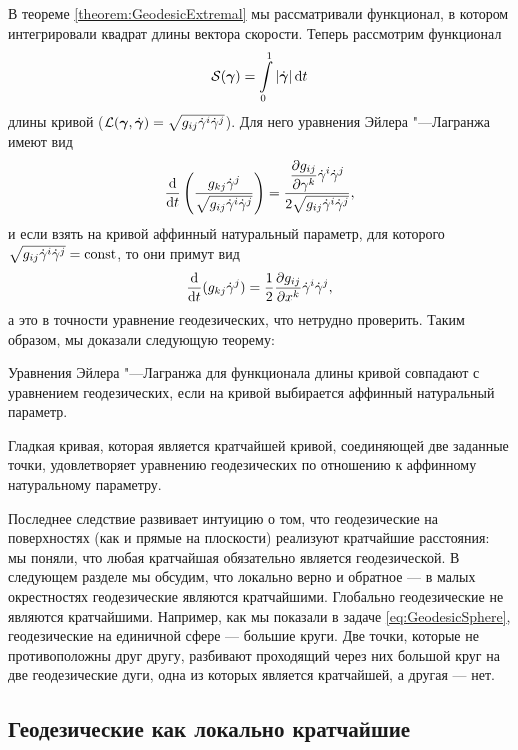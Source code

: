 В теореме \ref{theorem:GeodesicExtremal} мы рассматривали функционал, в котором интегрировали квадрат длины вектора скорости. Теперь рассмотрим функционал
\[
	\mathcal{S}(\boldsymbol{\gamma}) = \int\limits_0^1\left\lvert\dot{\boldsymbol{\gamma}}\right\rvert\mathop{}\!\mathrm{d} t
\]
длины кривой ($\mathcal{L}(\boldsymbol{\gamma}, \dot{\boldsymbol{\gamma}}) = \sqrt{g_{ij}\dot{\gamma}^i\dot{\gamma}^j}$). Для него уравнения Эйлера "---Лагранжа имеют вид
\[
	\frac{\mathop{}\!\mathrm{d}}{\mathop{}\!\mathrm{d} t}\left(\frac{g_{kj}\dot{\gamma}^j}{\sqrt{g_{ij}\dot{\gamma}^i\dot{\gamma}^j}}\right) = \frac{\displaystyle\frac{\partial g_{ij}}{\partial\gamma^k}\dot{\gamma}^i\dot{\gamma}^j}{2\sqrt{g_{ij}\dot{\gamma}^i\dot{\gamma}^j}},
\]
и если взять на кривой аффинный натуральный параметр, для которого $\sqrt{g_{ij}\dot{\gamma}^i\dot{\gamma}^j} = \mathrm{const}$, то они примут вид
\[
	\frac{\mathop{}\!\mathrm{d}}{\mathop{}\!\mathrm{d} t}(g_{kj}\dot{\gamma}^j) = \frac{1}{2}\frac{\partial g_{ij}}{\partial x^k}\dot{\gamma}^i\dot{\gamma}^j,
\]
а это в точности уравнение геодезических, что нетрудно проверить. Таким образом, мы доказали следующую теорему:

\begin{theorem}
	Уравнения Эйлера "---Лагранжа для функционала длины кривой совпадают с уравнением геодезических, если на кривой выбирается аффинный натуральный параметр.
\end{theorem}

\begin{corollary}
	Гладкая кривая, которая является кратчайшей кривой, соединяющей две заданные точки, удовлетворяет уравнению геодезических по отношению к аффинному натуральному параметру.
\end{corollary}

Последнее следствие развивает интуицию о том, что геодезические на поверхностях (как и прямые на плоскости) реализуют кратчайшие расстояния: мы поняли, что любая кратчайшая обязательно является геодезической. В следующем разделе мы обсудим, что локально верно и обратное --- в малых окрестностях геодезические являются кратчайшими. Глобально геодезические не являются кратчайшими. Например, как мы показали в задаче \ref{eq:GeodesicSphere}, геодезические на единичной сфере --- большие круги. Две точки, которые не противоположны друг другу, разбивают проходящий через них большой круг на две геодезические дуги, одна из которых является кратчайшей, а другая --- нет.

\subsection{Геодезические как локально кратчайшие}

